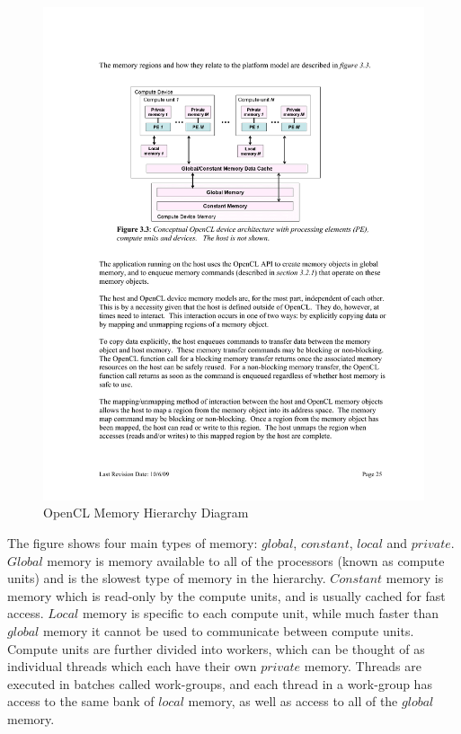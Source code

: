 \begin{figure}[!htc]
 		\centering
		\includegraphics[scale=1.0]{figures/gpu_memory.pdf}
        \caption{ OpenCL Memory Hierarchy Diagram \cite{OpenCLSpec} }
        \label{fig:gpu_memory}
\end{figure}

The figure shows four main types of memory: $global$, $constant$, $local$ and
$private$. $Global$ memory is memory available to all of the processors (known
as compute units) and is the slowest type of memory in the hierarchy.
$Constant$ memory is memory which is read-only by the compute units, and is
usually cached for fast access. $Local$ memory is specific to each compute
unit, while much faster than $global$ memory it cannot be used to communicate
between compute units. Compute units are further divided into workers, which
can be thought of as individual threads which each have their own $private$
memory. Threads are executed in batches called work-groups, and each thread in a
work-group has access to the same bank of $local$ memory, as well as access to
all of the $global$ memory. 


